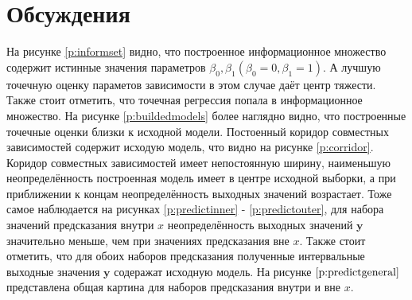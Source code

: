 \documentclass[a4paper,12pt]{article}
\begin{document}
    \section{Обсуждения}
    На рисунке \ref{p:informset} видно, что построенное информационное множество содержит истинные значения параметров $ \beta_{0}, \beta_{1} (\beta_{0} = 0, \beta_{1} = 1) $.
    А лучшую точечную оценку параметов зависимости в этом случае даёт центр тяжести. Также стоит отметить, что точечная регрессия попала в информационное множество.
    На рисунке \ref{p:buildedmodels} более наглядно видно, что построенные точечные оценки близки к исходной модели. \newline
    Постоенный коридор совместных зависимостей содержит исходую модель, что видно на рисунке \ref{p:corridor}.
    Коридор совместных зависимостей имеет непостоянную ширину, наименьшую неопределённость построенная модель имеет в центре исходной выборки, 
    а при приближении к концам неопределённость выходных значений возрастает. \newline
    Тоже самое наблюдается на рисунках \ref{p:predictinner} - \ref{p:predictouter}, для набора значений предсказания внутри $ x $ неопределённость выходных значений $ \textbf{y} $ значительно меньше, 
    чем при значениях предсказания вне $ x $. Также стоит отметить, что для обоих наборов предсказания полученные интервальные выходные значения $ \textbf{y} $ содеражат исходную модель.
    На рисунке $ \ref{p:predictgeneral} $ представлена общая картина для наборов предсказания внутри и вне $ x $.
\end{document}

